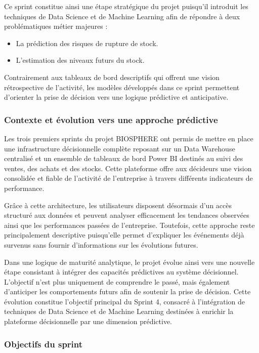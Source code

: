 Ce sprint constitue ainsi une étape stratégique du projet puisqu'il introduit les techniques de Data Science et de Machine Learning afin de répondre à deux problématiques métier majeures :
 
\begin{itemize}
    \item La prédiction des risques de rupture de stock.
    \item L'estimation des niveaux futurs du stock.
\end{itemize}
 
Contrairement aux tableaux de bord descriptifs qui offrent une vision rétrospective de l'activité, les modèles développés dans ce sprint permettent d'orienter la prise de décision vers une logique prédictive et anticipative.
 
\subsubsection{Contexte et évolution vers une approche prédictive}
 
Les trois premiers sprints du projet BIOSPHERE ont permis de mettre en place une infrastructure décisionnelle complète reposant sur un Data Warehouse centralisé et un ensemble de tableaux de bord Power BI destinés au suivi des ventes, des achats et des stocks. Cette plateforme offre aux décideurs une vision consolidée et fiable de l'activité de l'entreprise à travers différents indicateurs de performance.
 
Grâce à cette architecture, les utilisateurs disposent désormais d'un accès structuré aux données et peuvent analyser efficacement les tendances observées ainsi que les performances passées de l'entreprise. Toutefois, cette approche reste principalement descriptive puisqu'elle permet d'expliquer les événements déjà survenus sans fournir d'informations sur les évolutions futures.
 
Dans une logique de maturité analytique, le projet évolue ainsi vers une nouvelle étape consistant à intégrer des capacités prédictives au système décisionnel. L'objectif n'est plus uniquement de comprendre le passé, mais également d'anticiper les comportements futurs afin de soutenir la prise de décision. Cette évolution constitue l'objectif principal du Sprint 4, consacré à l'intégration de techniques de Data Science et de Machine Learning destinées à enrichir la plateforme décisionnelle par une dimension prédictive.
 
\subsubsection{Objectifs du sprint}
 
